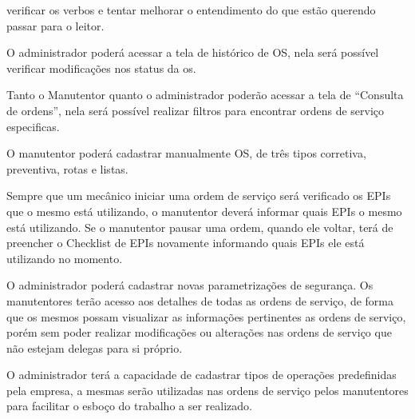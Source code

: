 {\color{green} verificar os verbos e tentar melhorar o entendimento do que estão querendo passar para o leitor.
	
	
O administrador poderá acessar a tela de histórico de OS, nela será possível verificar modificações nos status da os.

Tanto o Manutentor quanto o administrador poderão acessar a tela de “Consulta de ordens”, nela será possível realizar filtros para encontrar ordens de serviço especificas.

O manutentor poderá cadastrar manualmente OS, de três tipos corretiva, preventiva, rotas e listas.

Sempre que um mecânico iniciar uma ordem de serviço será verificado os EPIs que o mesmo está utilizando, o manutentor deverá informar quais EPIs o mesmo está utilizando.
Se o manutentor pausar uma ordem, quando ele voltar, terá de preencher o Checklist de EPIs novamente informando quais EPIs ele está utilizando no momento.

O administrador poderá cadastrar novas parametrizações de segurança.
Os manutentores terão acesso aos detalhes de todas as ordens de serviço, de forma que os mesmos possam visualizar as informações pertinentes as ordens de serviço, porém sem poder realizar modificações ou alterações nas ordens de serviço que não estejam delegas para si próprio.

O administrador terá a capacidade de cadastrar tipos de operações predefinidas pela empresa, a mesmas serão utilizadas nas ordens de serviço pelos manutentores para facilitar o esboço do trabalho a ser realizado. 


}


